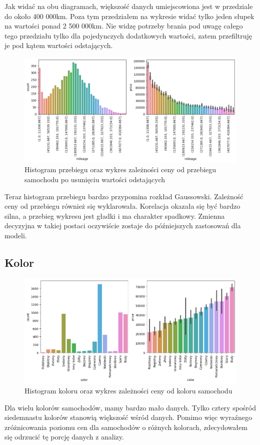 \documentclass{article}
\begin{document}
Jak widać na obu diagramach, większość danych umiejscowiona jest w przedziale do około 400 000km. Poza tym przedziałem na wykresie widać tylko jeden słupek na wartości ponad 2 500 000km. Nie widzę potrzeby brania pod uwagę całego tego przedziału tylko dla pojedynczych dodatkowych wartości, zatem przefiltruję je pod kątem wartości odstających.

\begin{figure}[H]
    \centering
    \includegraphics[width=1\linewidth]{images/przebieg_po.png}
    \caption{Histogram przebiegu oraz wykres zależności ceny od przebiegu samochodu po usunięciu wartości odstających}
    \label{fig:enter-label}
\end{figure}

Teraz histogram przebiegu bardzo przypomina rozkład Gaussowski. Zależność ceny od przebiegu również się wyklarowała. Korelacja okazała się być bardzo silna, a przebieg wykresu jest gładki i ma charakter spadkowy.
Zmienna decyzyjna w takiej postaci oczywiście zostaje do późniejszych zastosowań dla modeli.

\subsection{Kolor}
\begin{figure}[H]
    \centering
    \includegraphics[width=1\linewidth]{images/kolor.png}
    \caption{Histogram koloru oraz wykres zależności ceny od koloru samochodu}
    \label{plt:color}
\end{figure}
Dla wielu kolorów samochodów, mamy bardzo mało danych. Tylko cztery spośród siedemnastu kolorów stanowią większość wśród danych. Pomimo więc wyraźnego zróżnicowania poziomu cen dla samochodów o różnych kolorach, zdecydowałem się odrzucić tę porcję danych z analizy.
\end{document}
